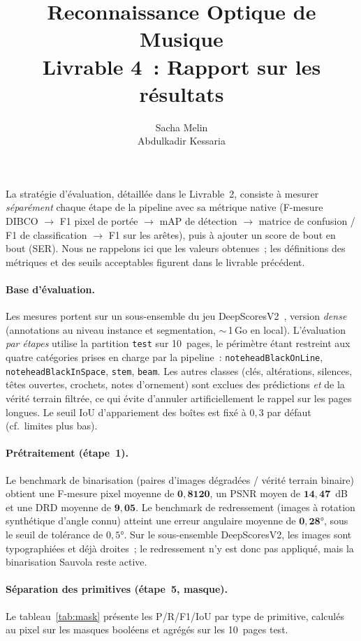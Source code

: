 \documentclass[a4paper,10pt]{article}
\title{\vspace{-1.5cm}\textbf{Reconnaissance Optique de Musique \\ \large Livrable 4~: Rapport sur les résultats}}
\author{Sacha Melin \\ Abdulkadir Kessaria}
\date{}
\begin{document}
\maketitle

La stratégie d'évaluation, détaillée dans le Livrable~2, consiste à mesurer \emph{séparément} chaque étape de la pipeline avec sa métrique native (F-mesure DIBCO $\rightarrow$ F1 pixel de portée $\rightarrow$ mAP de détection $\rightarrow$ matrice de confusion / F1 de classification $\rightarrow$ F1 sur les arêtes), puis à ajouter un score de bout en bout (SER). Nous ne rappelons ici que les valeurs obtenues~; les définitions des métriques et des seuils acceptables figurent dans le livrable précédent.

\paragraph{Base d'évaluation.}
Les mesures portent sur un sous-ensemble du jeu DeepScoresV2~\cite{tuggener2020deepscores}, version \emph{dense} (annotations au niveau instance et segmentation, $\sim$\,1\,Go en local). L'évaluation \emph{par étapes} utilise la partition \texttt{test} sur 10~pages, le périmètre étant restreint aux quatre catégories prises en charge par la pipeline~: \texttt{noteheadBlackOnLine}, \texttt{noteheadBlackInSpace}, \texttt{stem}, \texttt{beam}. Les autres classes (clés, altérations, silences, têtes ouvertes, crochets, notes d'ornement) sont exclues des prédictions \emph{et} de la vérité terrain filtrée, ce qui évite d'annuler artificiellement le rappel sur les pages longues. Le seuil IoU d'appariement des boîtes est fixé à $0{,}3$ par défaut (cf.~limites plus bas).

\paragraph{Prétraitement (étape~1).}
Le benchmark de binarisation (paires d'images dégradées / vérité terrain binaire) obtient une F-mesure pixel moyenne de $\mathbf{0{,}8120}$, un PSNR moyen de $\mathbf{14{,}47}$~dB et une DRD moyenne de $\mathbf{9{,}05}$. Le benchmark de redressement (images à rotation synthétique d'angle connu) atteint une erreur angulaire moyenne de $\mathbf{0{,}28°}$, sous le seuil de tolérance de $0{,}5°$. Sur le sous-ensemble DeepScoresV2, les images sont typographiées et déjà droites~; le redressement n'y est donc pas appliqué, mais la binarisation Sauvola reste active.

\paragraph{Séparation des primitives (étape~5, masque).}
Le tableau~\ref{tab:mask} présente les P/R/F1/IoU par type de primitive, calculés au pixel sur les masques booléens et agrégés sur les 10~pages test.
\end{document}
